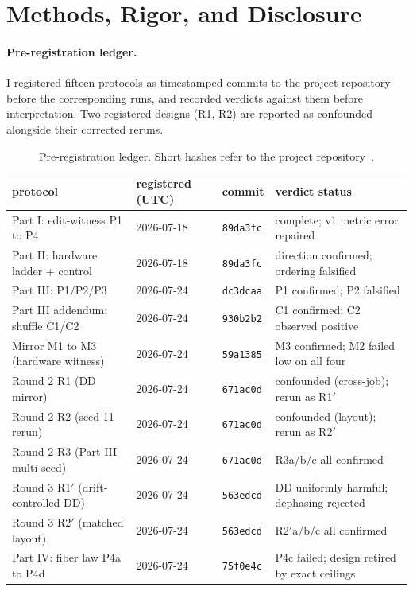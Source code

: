 \section{Methods, Rigor, and Disclosure}\label{sec:methods}

\paragraph{Pre-registration ledger.} I registered fifteen protocols as timestamped commits to the project repository before the corresponding runs, and recorded verdicts against them before interpretation. Two registered designs (R1, R2) are reported as confounded alongside their corrected reruns.

\begin{table}[htbp]
\centering\scriptsize
\caption{Pre-registration ledger. Short hashes refer to the project repository~\cite{appliedrepo2026}.}
\label{tab:prereg}
\begin{tabular}{@{}lll >{\raggedright\arraybackslash}p{5.2cm}@{}}
\toprule
protocol & registered (UTC) & commit & verdict status \\
\midrule
Part I: edit-witness P1 to P4 & 2026-07-18 & \texttt{89da3fc} & complete; v1 metric error repaired \\
Part II: hardware ladder + control & 2026-07-18 & \texttt{89da3fc} & direction confirmed; ordering falsified \\
Part III: P1/P2/P3 & 2026-07-24 & \texttt{dc3dcaa} & P1 confirmed; P2 falsified \\
Part III addendum: shuffle C1/C2 & 2026-07-24 & \texttt{930b2b2} & C1 confirmed; C2 observed positive \\
Mirror M1 to M3 (hardware witness) & 2026-07-24 & \texttt{59a1385} & M3 confirmed; M2 failed low on all four \\
Round 2 R1 (DD mirror) & 2026-07-24 & \texttt{671ac0d} & confounded (cross-job); rerun as R1$'$ \\
Round 2 R2 (seed-11 rerun) & 2026-07-24 & \texttt{671ac0d} & confounded (layout); rerun as R2$'$ \\
Round 2 R3 (Part III multi-seed) & 2026-07-24 & \texttt{671ac0d} & R3a/b/c all confirmed \\
Round 3 R1$'$ (drift-controlled DD) & 2026-07-24 & \texttt{563edcd} & DD uniformly harmful; dephasing rejected \\
Round 3 R2$'$ (matched layout) & 2026-07-24 & \texttt{563edcd} & R2$'$a/b/c all confirmed \\
Part IV: fiber law P4a to P4d & 2026-07-24 & \texttt{75f0e4c} & P4c failed; design retired by exact ceilings \\

\end{tabular}
\end{table}
